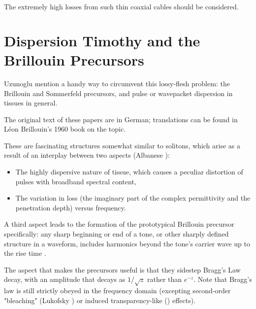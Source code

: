 \documentclass[paper.tex]{subfiles}
\begin{document}
The extremely high losses from such thin coaxial cables should be considered.


\pagebreak
\section{Dispersion Timothy and the Brillouin Precursors}

Uzunoglu \cite{Theoretical2020} mention a handy way to circumvent this lossy-flesh problem: the Brillouin and Sommerfeld precursors\footnotemark, and pulse or wavepacket dispersion in tissues in general.\footnotemark




The original text of these papers are in German; translations can be found in Léon Brillouin's 1960 
book\cite{Wave1960} on the topic. \footnotemark

These are fascinating structures somewhat similar to solitons, which arise as a result of an interplay between two aspects (Albanese 
\cite{Shortrisetime1989}): 

\begin{itemize}
	\item The highly dispersive nature of tissue, which causes a peculiar distortion of pulses with broadband spectral content,
	\item The variation in loss (the imaginary part of the complex permittivity and the penetration depth) versus frequency. 
\end{itemize}


A third aspect leads to the formation of the prototypical Brillouin precursor specifically: any sharp 
beginning or end of a tone, or other sharply defined structure in a waveform, includes harmonics beyond the tone's carrier wave up to the rise time \footnotemark. 

The aspect that makes the precursors useful is that they sidestep Bragg's Law decay, with an amplitude that decays as $1/\sqrt{z}$ rather than $e^{-z}$. Note that Bragg's law is still strictly obeyed in the frequency domain (excepting second-order "bleaching" (Lukofsky \cite{Can}) or induced transparency-like (\cite{Electromagnetically1997}) effects).
\end{document}
